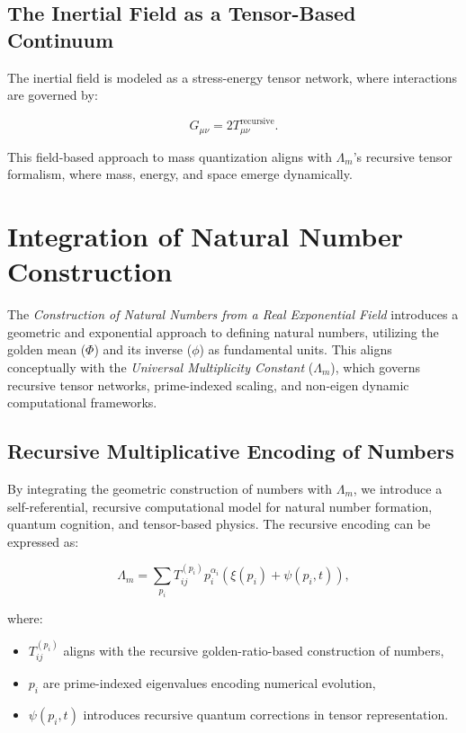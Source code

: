 \documentclass{article}
\theoremstyle{plain}
\begin{document}
\begin{itemize}
\begin{itemize}
\subsection{The Inertial Field as a Tensor-Based Continuum}

The inertial field is modeled as a stress-energy tensor network, where interactions are governed by:

\begin{equation}
    G_{\mu\nu} = 2 T_{\mu\nu}^{\text{recursive}}.
\end{equation}

This field-based approach to mass quantization aligns with $\Lambda_m$’s recursive tensor formalism, where mass, energy, and space emerge dynamically.
\section{Integration of Natural Number Construction}

The \textit{Construction of Natural Numbers from a Real Exponential Field} introduces a geometric and exponential approach to defining natural numbers, utilizing the golden mean ($\Phi$) and its inverse ($\phi$) as fundamental units. This aligns conceptually with the \textit{Universal Multiplicity Constant} ($\Lambda_m$), which governs recursive tensor networks, prime-indexed scaling, and non-eigen dynamic computational frameworks.

\subsection{Recursive Multiplicative Encoding of Numbers}

By integrating the geometric construction of numbers with $\Lambda_m$, we introduce a self-referential, recursive computational model for natural number formation, quantum cognition, and tensor-based physics. The recursive encoding can be expressed as:

\begin{equation}
    \Lambda_m = \sum_{p_i} T_{ij}^{(p_i)} p_i^{\alpha_i} \left( \xi(p_i) + \psi(p_i, t) \right),
\end{equation}

where:
\begin{itemize}
    \item $T_{ij}^{(p_i)}$ aligns with the recursive golden-ratio-based construction of numbers,
    \item $p_i$ are prime-indexed eigenvalues encoding numerical evolution,
    \item $\psi(p_i, t)$ introduces recursive quantum corrections in tensor representation.
\end{itemize}


\end{itemize}
\end{itemize}
\end{document}
